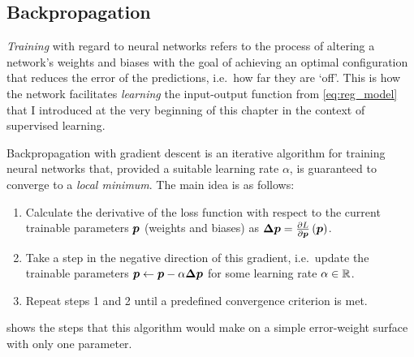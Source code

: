 \documentclass[../report.tex]{subfiles}
\begin{document}
\subsection{Backpropagation}
\emph{Training} with regard to neural networks refers to the process of altering a network's weights and biases with the goal of achieving an optimal configuration that reduces the error of the predictions, i.e.\ how far they are `off'. 
This is how the network facilitates \emph{learning} the input-output function from \cref{eq:reg_model} that I introduced at the very beginning of this chapter in the context of supervised learning.

Backpropagation with gradient descent is an iterative algorithm for training neural networks that, provided a suitable learning rate $\alpha$, is guaranteed to converge to a \emph{local minimum}.
The main idea is as follows:
\begin{enumerate}
    \item Calculate the derivative of the loss function with respect to the current trainable parameters ${\bm{p}}$ (weights and biases) as
        $\bm{\Delta p} = \frac{\partial L}{\partial {\bm{p}}}\left({\bm{p}}\right)$.
    \item Take a step in the negative direction of this gradient, i.e.\ update the trainable parameters ${\bm{p}} \leftarrow {\bm{p}} - \alpha \bm{\Delta p}$ for some learning rate $\alpha \in \mathbb{R}$.
    \item Repeat steps 1 and 2 until a predefined convergence criterion is met.
\end{enumerate}
 shows the steps that this algorithm would make on a simple error-weight surface with only one parameter.
\end{document}
